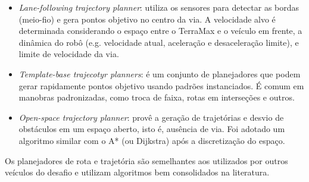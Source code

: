 \begin{itemize}
  \item \textit{Lane-following trajectory planner}: utiliza os sensores para
  detectar as bordas (meio-fio) e gera pontos objetivo no centro da via. A
  velocidade alvo é determinada considerando o espaço entre o TerraMax e o
  veículo em frente, a dinâmica do robô (e.g. velocidade atual,
  aceleração e desaceleração limite), e limite de velocidade da via.
  \item \textit{Template-base trajecotyr planners}: é um conjunto de
  planejadores que podem gerar rapidamente pontos objetivo usando padrões
  instanciados. É comum em manobras padronizadas, como troca de faixa, rotas em
  interseções e outros.
  \item \textit{Open-space trajectory planner}: provê a geração de trajetórias e
  desvio de obstáculos em um espaço aberto, isto é, ausência de via. Foi adotado
  um algoritmo similar com o A* (ou Dijkstra) após a discretização do espaço.
\end{itemize}

Os planejadores de rota e trajetória são semelhantes aos utilizados por outros
veículos do desafio e utilizam algoritmos bem consolidados na literatura.
